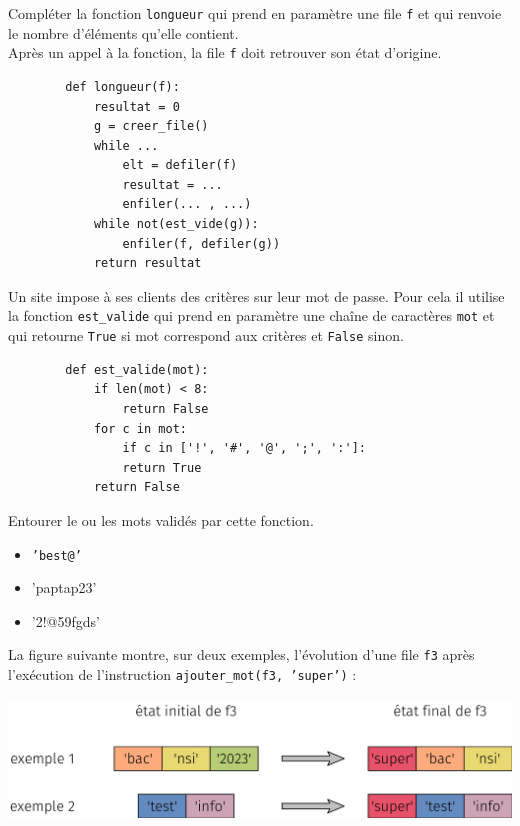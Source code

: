 \documentclass[a4paper,12pt,eval,firamath]{nsi}
\begin{document}

\question Compléter la fonction \texttt{longueur}  qui prend en
paramètre une file \texttt{f}  et qui renvoie le nombre d'éléments qu'elle contient.\\
Après un appel à la fonction, la file \texttt{f}  doit retrouver son état d'origine.\\

\begin{pyc}
      \begin{verbatim}
        def longueur(f):
            resultat = 0
            g = creer_file()
            while ... 
                elt = defiler(f)
                resultat = ...
                enfiler(... , ...)
            while not(est_vide(g)):
                enfiler(f, defiler(g))
            return resultat
    \end{verbatim}
\end{pyc}

Un site impose à ses clients des critères sur leur mot de passe. Pour cela il utilise
la fonction \texttt{est_valide}  qui prend en paramètre une chaîne de caractères \texttt{mot}  et qui retourne \texttt{True}  si mot correspond aux critères et \texttt{False}  sinon.

\begin{pyc}
      \begin{verbatim}
        def est_valide(mot):
            if len(mot) < 8:
                return False
            for c in mot:
                if c in ['!', '#', '@', ';', ':']:
                return True
            return False
    \end{verbatim}
\end{pyc}

\question Entourer le ou les mots validés par cette fonction.

\begin{itemize}
      \item \texttt{'best@'}
      \item 'paptap23'
      \item '2!@59fgds'
\end{itemize}

La figure suivante montre, sur deux exemples, l'évolution d'une file \texttt{f3}  après
l'exécution de l'instruction \texttt{ajouter_mot(f3, 'super')}  :
\begin{center}
      \includegraphics[width = 15cm]{img/fig03.png}
\end{center}
\end{document}
